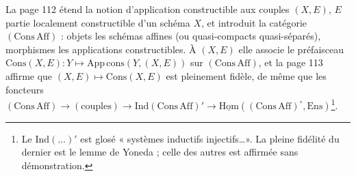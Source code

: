 \documentclass[11pt,a4paper]{article}
\begin{document}
La page 112 étend la notion d'application constructible aux couples $(X, E)$,
$E$ partie localement constructible d'un schéma $X$, et introduit la catégorie
$(\mathrm{Cons\,Aff})$ : objets les schémas affines (ou quasi-compacts
quasi-séparés), morphismes les applications constructibles. À $(X,E)$ elle
associe le préfaisceau $\mathrm{Cons}(X,E) : Y \mapsto \mathrm{App\,cons}(Y, (X,E))$
sur $(\mathrm{Cons\,Aff})$, et la page 113 affirme que $(X,E) \mapsto
\mathrm{Cons}(X,E)$ est pleinement fidèle, de même que les foncteurs
$(\mathrm{Cons\,Aff}) \to (\text{couples}) \to \mathrm{Ind}(\mathrm{Cons\,Aff})' \to
\underline{\mathrm{Hom}}((\mathrm{Cons\,Aff})^{\circ}, \mathrm{Ens})$\footnote{Le
$\mathrm{Ind}(\ldots)'$ est glosé « systèmes inductifs injectifs\ldots ». La
pleine fidélité du dernier est le lemme de Yoneda ; celle des autres est
affirmée sans démonstration.}.
\end{document}
